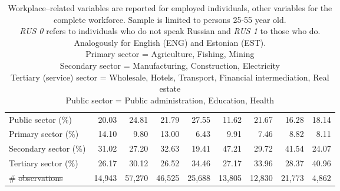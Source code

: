 \documentclass[12pt, a4paper]{article}
\providecommand{\DIFaddtex}[1]{{\protect\color{blue}\uwave{#1}}} %
\providecommand{\DIFdeltex}[1]{{\protect\color{red}\sout{#1}}}                      %
\providecommand{\DIFaddbegin}{} %
\providecommand{\DIFaddend}{} %
\providecommand{\DIFdelbegin}{} %
\providecommand{\DIFdelend}{} %
\providecommand{\DIFadd}[1]{\texorpdfstring{\DIFaddtex{#1}}{#1}} %
\providecommand{\DIFdel}[1]{\texorpdfstring{\DIFdeltex{#1}}{}} %
\newcommand{\DIFscaledelfig}{0.5}
\newlength{\DIFdelgraphicswidth} %
\newlength{\DIFdelgraphicsheight} %
\newcommand{\DIFaddincludegraphics}[2][]{{\color{blue}\fbox{\DIFOincludegraphics[#1]{#2}}}} %
\newcommand{\DIFdelincludegraphics}[2][]{%
\sbox{\DIFdelgraphicsbox}{\DIFOincludegraphics[#1]{#2}}%
\settoboxwidth{\DIFdelgraphicswidth}{\DIFdelgraphicsbox} %
\settoboxtotalheight{\DIFdelgraphicsheight}{\DIFdelgraphicsbox} %
\scalebox{\DIFscaledelfig}{%
\parbox[b]{\DIFdelgraphicswidth}{\usebox{\DIFdelgraphicsbox}\\[-\baselineskip] \rule{\DIFdelgraphicswidth}{0em}}\llap{\resizebox{\DIFdelgraphicswidth}{\DIFdelgraphicsheight}{%
\setlength{\unitlength}{\DIFdelgraphicswidth}%
\begin{picture}(1,1)%
\thicklines\linethickness{2pt} %
{\color[rgb]{1,0,0}\put(0,0){\framebox(1,1){}}}%
{\color[rgb]{1,0,0}\put(0,0){\line( 1,1){1}}}%
{\color[rgb]{1,0,0}\put(0,1){\line(1,-1){1}}}%
\end{picture}%
}\hspace*{3pt}}} %
} %
\DeclareRobustCommand{\DIFaddbegin}{\DIFOaddbegin \let\includegraphics\DIFaddincludegraphics} %
\DeclareRobustCommand{\DIFaddend}{\DIFOaddend \let\includegraphics\DIFOincludegraphics} %
\DeclareRobustCommand{\DIFdelbegin}{\DIFOdelbegin \let\includegraphics\DIFdelincludegraphics} %
\DeclareRobustCommand{\DIFdelend}{\DIFOaddend \let\includegraphics\DIFOincludegraphics} %
\begin{document}
\begin{table}
\begin{tabular}{l|rrrr|rrrr}
		Public sector (\%)     & 20.03 & 24.81 & 21.79 & 27.55 & 11.62 & 21.67 & 16.28 & 18.14 \\
		Primary sector (\%)     & 14.10 & 9.80  & 13.00 & 6.43  & 9.91  & 7.46  & 8.82  & 8.11  \\
		Secondary sector (\%)    & 31.02 & 27.20 & 32.63 & 19.41 & 47.21 & 29.72 & 41.54 & 24.07 \\
		Tertiary sector (\%)    & 26.17 & 30.12 & 26.52 & 34.46 & 27.17 & 33.96 & 28.37 & 40.96 \\
		\# \DIFdelbegin \DIFdel{observations             }\DIFdelend \DIFaddbegin \DIFadd{Observations       }\DIFaddend & 14,943 & 57,270 & 46,525 & 25,688 & 13,805 & 12,830 & 21,773 & 4,862 \\ \bottomrule
	\end{tabular}%
	\label{tab:descriptive}%
                             \DIFdelbegin %
\DIFdelend \DIFaddbegin 

                           
	\caption*{\small
				Workplace--related variables are reported for employed individuals,
			other variables for the complete workforce. Sample is limited to persons
			25-55 year old.\\
			\emph{RUS 0} refers to individuals who do not speak Russian and
			\emph{RUS 1} to those who do. Analogously for  
			English
			(ENG) and
			Estonian (EST).\\
			Primary sector = Agriculture,
			Fishing, Mining \\ Secondary sector = Manufacturing,
			Construction, Electricity \\ Tertiary (service) sector =
			Wholesale, Hotels, Transport, Financial intermediation, Real
			estate \\ Public sector = Public administration, Education,
			Health
		}
\DIFaddend \end{table}%
\end{document}
